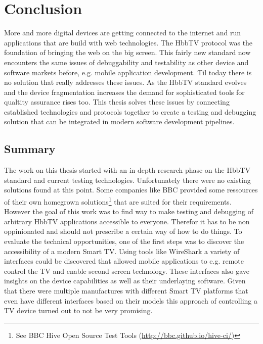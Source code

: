 \chapter{Conclusion\label{cha:chapter7}}

%

More and more digital devices are getting connected to the internet and run applications that are build with web
technologies. The HbbTV protocol was the foundation of bringing the web on the big screen. This fairly new standard
now encounters the same issues of debuggability and testability as other device and software markets before, e.g.
mobile application development. Til today there is no solution that really addresses these issues. As the HbbTV
standard evolves and the device fragmentation increases the demand for sophisticated tools for qualtity assurance
rises too. This thesis solves these issues by connecting established technologies and protocols together to create
a testing and debugging solution that can be integrated in modern software development pipelines.

\section{Summary\label{sec:summary}}


The work on this thesis started with an in depth research phase on the HbbTV standard and current testing technologies.
Unfortunately there were no existing solutions found at this point. Some companies like BBC provided some ressources
of their own homegrown solutions\footnote{See BBC Hive Open Source Test Tools (\url{http://bbc.github.io/hive-ci/})}
that are suited for their requirements. However the goal of this work was to find way to make testing and debugging
of arbitrary HbbTV applications accessible to everyone. Therefor it has to be non oppinionated and should not prescribe
a certain way of how to do things. To evaluate the technical opportunities, one of the first steps was to discover
the accessibility of a modern Smart TV. Using tools like WireShark a variety of interfaces could be discovered that
allowed mobile applications to e.g. remote control the TV and enable second screen technology. These interfaces also
gave insights on the device capabilities as well as their underlaying software. Given that there were multiple
manufactures with different Smart TV platforms that even have different interfaces based on their models this approach
of controlling a TV device turned out to not be very promising.

